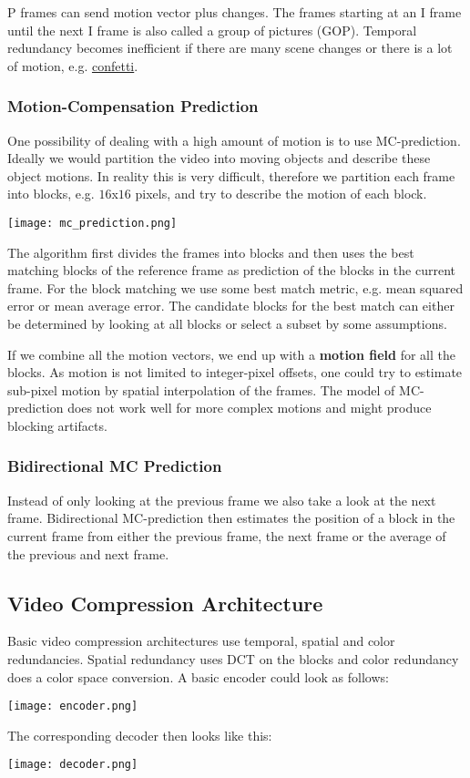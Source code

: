 P frames can send motion vector plus changes. The frames starting at an I frame until the next I frame is also called a group of pictures (GOP). Temporal redundancy becomes inefficient if there are many scene changes or there is a lot of motion, e.g. \href{https://www.youtube.com/watch?v=r6Rp-uo6HmI&feature=youtu.be}{confetti}.

\subsubsection{Motion-Compensation Prediction}

One possibility of dealing with a high amount of motion is to use MC-prediction. Ideally we would partition the video into moving objects and describe these object motions. In reality this is very difficult, therefore we partition each frame into blocks, e.g. $16$x$16$ pixels, and try to describe the motion of each block.
\begin{center}
	\texttt{[image: mc\_prediction.png]}
\end{center}

The algorithm first divides the frames into blocks and then uses the best matching blocks of the reference frame as prediction of the blocks in the current frame. For the block matching we use some best match metric, e.g. mean squared error or mean average error. The candidate blocks for the best match can either be determined by looking at all blocks or select a subset by some assumptions. \medskip

If we combine all the motion vectors, we end up with a \textbf{motion field} for all the blocks. As motion is not limited to integer-pixel offsets, one could try to estimate sub-pixel motion by spatial interpolation of the frames. The model of MC-prediction does not work well for more complex motions and might produce blocking artifacts.


\subsubsection{Bidirectional MC Prediction}

Instead of only looking at the previous frame we also take a look at the next frame. Bidirectional MC-prediction then estimates the position of a block in the current frame from either the previous frame, the next frame or the average of the previous and next frame.


\subsection{Video Compression Architecture}

Basic video compression architectures use temporal, spatial and color redundancies. Spatial redundancy uses DCT on the blocks and color redundancy does a color space conversion. A basic encoder could look as follows:
\begin{center}
	\texttt{[image: encoder.png]}
\end{center}

The corresponding decoder then looks like this:
\begin{center}
	\texttt{[image: decoder.png]}
\end{center}